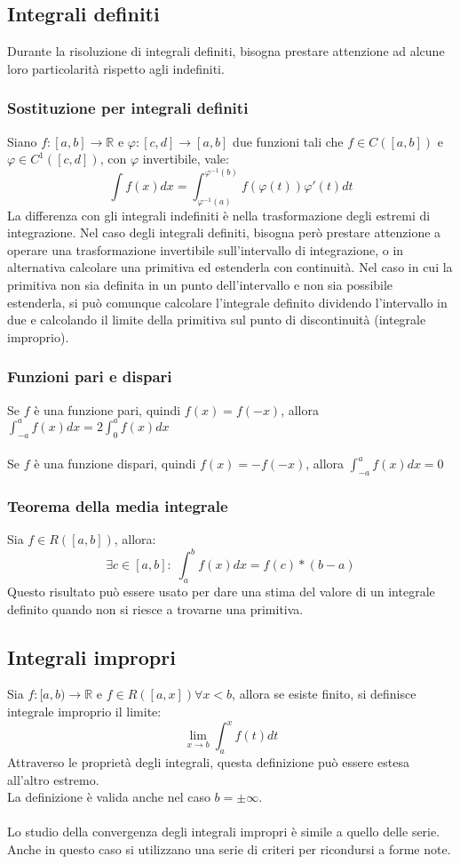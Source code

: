 \documentclass{article}
\newcommand{\R}{\mathds{R}}
\begin{document}
\subsection{Integrali definiti}
Durante la risoluzione di integrali definiti, bisogna prestare attenzione ad alcune loro particolarità rispetto agli indefiniti.

\subsubsection{Sostituzione per integrali definiti}
Siano $f:[a,b]\rightarrow\R$ e $\varphi:[c,d]\rightarrow[a,b]$ due funzioni tali che $f\in C([a,b])$ e $\varphi\in C^1([c,d])$, con $\varphi$ invertibile, vale: $$\int f(x)dx=\int^{\varphi^{-1}(b)}_{\varphi^{-1}(a)}f(\varphi(t))\varphi'(t)dt$$
La differenza con gli integrali indefiniti è nella trasformazione degli estremi di integrazione. Nel caso degli integrali definiti, bisogna però prestare attenzione a operare una trasformazione invertibile sull'intervallo di integrazione, o in alternativa calcolare una primitiva ed estenderla con continuità. Nel caso in cui la primitiva non sia definita in un punto dell'intervallo e non sia possibile estenderla, si può comunque calcolare l'integrale definito dividendo l'intervallo in due e calcolando il limite della primitiva sul punto di discontinuità (integrale improprio).

\subsubsection{Funzioni pari e dispari}
Se $f$ è una funzione pari, quindi $f(x)=f(-x)$, allora $\int^a_{-a}f(x)dx=2\int^a_0f(x)dx$\\\\
Se $f$ è una funzione dispari, quindi $f(x)=-f(-x)$, allora $\int^a_{-a}f(x)dx=0$\\

\subsubsection{Teorema della media integrale}
Sia $f\in R([a,b])$, allora:
$$\exists c\in [a,b]:\;\int_a^bf(x)dx=f(c)*(b-a)$$
Questo risultato può essere usato per dare una stima del valore di un integrale definito quando non si riesce a trovarne una primitiva.


\subsection{Integrali impropri}
Sia $f:[a,b)\rightarrow\R$ e $f\in R([a,x]) \forall x<b$, allora se esiste finito, si definisce integrale improprio il limite:
$$\lim_{x\rightarrow b}\int_a^xf(t)dt $$
Attraverso le proprietà degli integrali, questa definizione può essere estesa all'altro estremo.\\
La definizione è valida anche nel caso $b=\pm\infty$.\\\\
Lo studio della convergenza degli integrali impropri è simile a quello delle serie. Anche in questo caso si utilizzano una serie di criteri per ricondursi a forme note.
\end{document}
